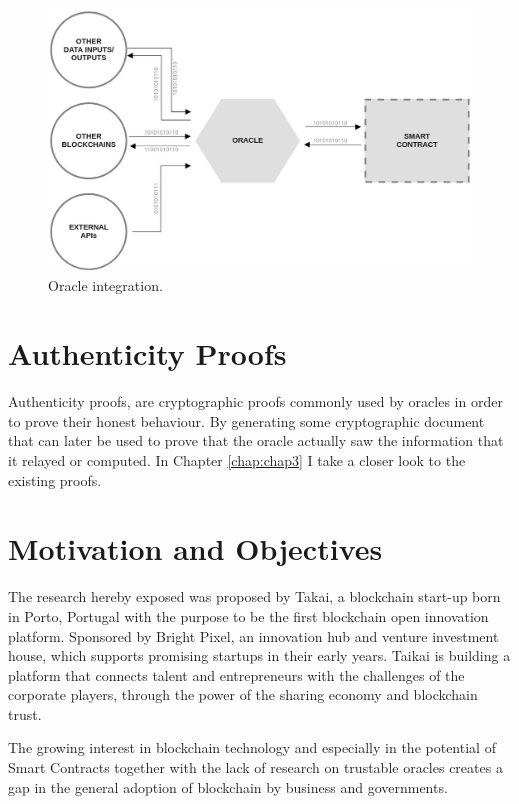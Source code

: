 \begin{figure}[H]
  \begin{center}
    \leavevmode
    \includegraphics[width=\textwidth]{figures/oracle.jpg}
    \caption{Oracle integration.}
    \label{fig:/figures/oracle.jpg}
  \end{center}
\end{figure}

\section{Authenticity Proofs}
Authenticity proofs, are cryptographic proofs commonly used by oracles in order to prove their honest behaviour. By generating some cryptographic document that can later be used to prove that the oracle actually saw the information that it relayed or computed. In Chapter \ref{chap:chap3} I take a closer look to the existing proofs.



\section{Motivation and Objectives} \label{sec:goals}
The research hereby exposed was proposed by Takai, a blockchain start-up born in Porto, Portugal with the purpose to be the first blockchain open innovation platform. Sponsored by Bright Pixel, an innovation hub and venture investment house, which supports promising startups in their early years. Taikai is building a platform that connects talent and entrepreneurs with the challenges of the corporate players, through the power of the sharing economy and blockchain trust.

The growing interest in blockchain technology and especially in the potential of Smart Contracts together with the lack of research on trustable oracles creates a gap in the general adoption of blockchain by business and governments.

